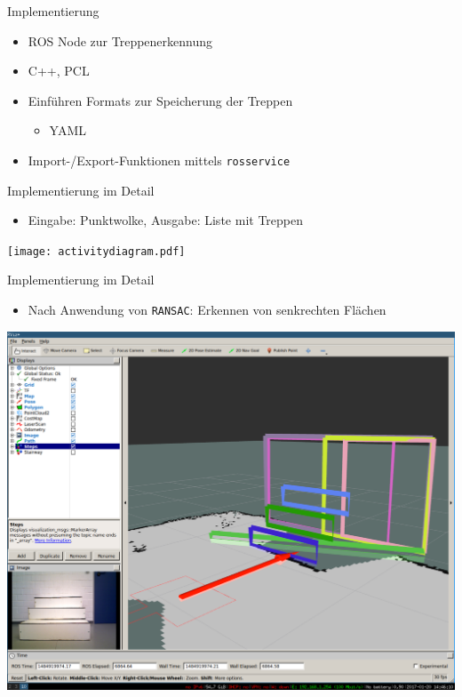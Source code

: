 \documentclass[18pt]{beamer}
\begin{document}
\begin{frame}{Implementierung}
\begin{itemize}
	\item ROS Node zur Treppenerkennung
	\item C++, PCL
	\item Einführen Formats zur Speicherung der Treppen
	\begin{itemize}
		\item YAML
	\end{itemize}
	\item Import-/Export-Funktionen mittels \texttt{rosservice}
\end{itemize}
\end{frame}

\begin{frame}{Implementierung im Detail}
\begin{itemize}
	\item Eingabe: Punktwolke, Ausgabe: Liste mit Treppen
\end{itemize}
\begin{center}
	\texttt{[image: activitydiagram.pdf]}
\end{center}
\end{frame}

\begin{frame}{Implementierung im Detail}
\begin{itemize}
	\item Nach Anwendung von \texttt{RANSAC}: Erkennen von senkrechten Flächen
\end{itemize}
\begin{center}
	\includegraphics[scale=0.16]{images/ransac01.pdf}
\end{center}
\end{frame}
\end{document}

